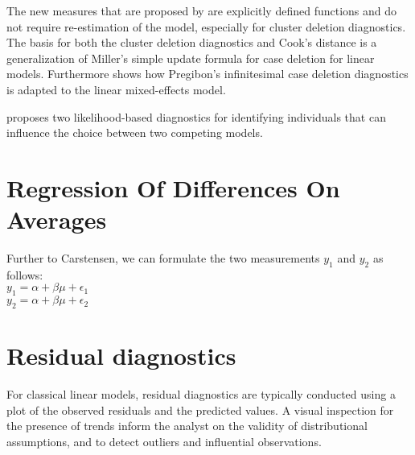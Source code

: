 \documentclass[12pt, a4paper]{report}
\theoremstyle{plain}
\theoremstyle{definition}
\theoremstyle{remark}
\begin{document}
The new measures that are proposed by \citet{Demi} are explicitly defined functions and do not require re-estimation of the model, especially for cluster deletion diagnostics. The basis for both the cluster deletion diagnostics and Cook's distance is a generalization of Miller's simple update formula for case deletion for linear models. Furthermore \citet{Demi} shows how Pregibon's infinitesimal case deletion diagnostics is adapted to the linear mixed-effects model. 


%
%
%

\citet{Demi} proposes two likelihood-based diagnostics for identifying individuals that can influence the choice between two competing models.


\newpage





\section{Regression Of Differences On Averages}
Further to Carstensen, we can formulate the two measurements
$y_{1}$ and $y_{2}$ as follows:
\\
$y_{1} = \alpha + \beta\mu + \epsilon_{1}$
\\
$y_{2} = \alpha + \beta\mu + \epsilon_{2}$


\section{Residual diagnostics} %
For classical linear models, residual diagnostics are typically conducted using a plot of the observed residuals and the predicted values. A visual inspection for the presence of trends inform the analyst on the validity of distributional assumptions, and to detect outliers and influential observations.

%
%
%
\end{document}
